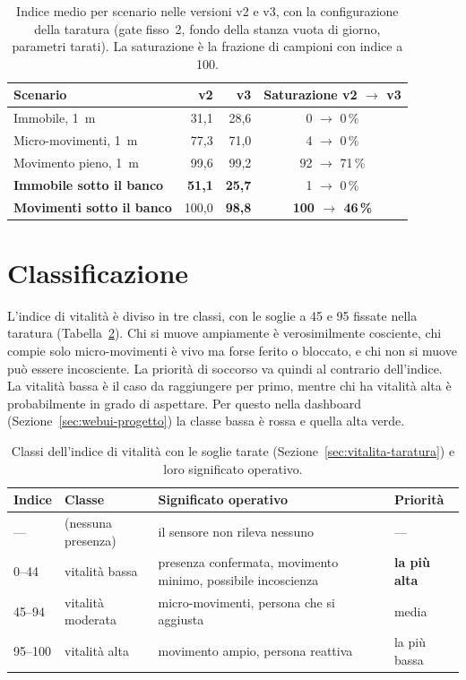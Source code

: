 \begin{table}[htbp]
\centering
\caption{Indice medio per scenario nelle versioni v2 e v3, con la configurazione della taratura (gate fisso~2, fondo della stanza vuota di giorno, parametri tarati). La saturazione è la frazione di campioni con indice a 100.}
\label{tab:vitalita-v2v3}
\small
\begin{tabular}{@{}lrrc@{}}
\toprule
Scenario & v2 & v3 & Saturazione v2 $\to$ v3 \\
\midrule
Immobile, 1~m & 31,1 & 28,6 & 0 $\to$ 0\,\% \\
Micro-movimenti, 1~m & 77,3 & 71,0 & 4 $\to$ 0\,\% \\
Movimento pieno, 1~m & 99,6 & 99,2 & 92 $\to$ 71\,\% \\
\textbf{Immobile sotto il banco} & \textbf{51,1} & \textbf{25,7} & 1 $\to$ 0\,\% \\
\textbf{Movimenti sotto il banco} & 100,0 & \textbf{98,8} & \textbf{100 $\to$ 46\,\%} \\
\bottomrule
\end{tabular}
\end{table}

\section{Classificazione}
\label{sec:vitalita-classi}

L'indice di vitalità è diviso in tre classi, con le soglie a 45 e 95 fissate nella taratura (Tabella~\ref{tab:vitalita-classi}). Chi si muove ampiamente è verosimilmente cosciente, chi compie solo micro-movimenti è vivo ma forse ferito o bloccato, e chi non si muove può essere incosciente. La priorità di soccorso va quindi al contrario dell'indice. La vitalità bassa è il caso da raggiungere per primo, mentre chi ha vitalità alta è probabilmente in grado di aspettare. Per questo nella dashboard (Sezione~\ref{sec:webui-progetto}) la classe bassa è rossa e quella alta verde.

\begin{table}[htbp]
\centering
\caption{Classi dell'indice di vitalità con le soglie tarate
(Sezione~\ref{sec:vitalita-taratura}) e loro significato operativo. }
\label{tab:vitalita-classi}
\small
\begin{tabularx}{\linewidth}{@{}llXl@{}}
\toprule
\textbf{Indice} & \textbf{Classe} & \textbf{Significato operativo} & \textbf{Priorità} \\
\midrule
--- & (nessuna presenza) & il sensore non rileva nessuno & --- \\
0--44 & vitalità bassa & presenza confermata, movimento minimo, possibile
  incoscienza & \textbf{la più alta} \\
45--94 & vitalità moderata & micro-movimenti, persona che si aggiusta & media \\
95--100 & vitalità alta & movimento ampio, persona reattiva & la più bassa \\
\bottomrule
\end{tabularx}
\end{table}

